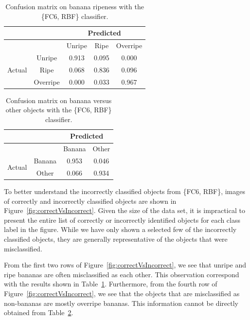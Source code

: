 \documentclass{article} %
\begin{document}
	
\begin{table}[h]
\centering
\caption{Confusion matrix on banana ripeness with the \{FC6, RBF\} classifier. }
\label{tab:ripenessMatrix}
\begin{tabular}{|c|c|c|c|c|}\hline
&&\multicolumn{3}{c|}{Predicted}\\\hline
&&Unripe&Ripe&Overripe\\\hline
\multirow{3}{*}{Actual}&Unripe&\cellcolor{SFUred!65}0.913&\cellcolor{SFUred!15}0.095&0.000\\\cline{2-5}
&Ripe&\cellcolor{SFUred!15}0.068&\cellcolor{SFUred!65}0.836&\cellcolor{SFUred!15}0.096\\\cline{2-5}
&Overripe&0.000&\cellcolor{SFUred!15}0.033&\cellcolor{SFUred!65}0.967\\\hline
\end{tabular}
\end{table}

\begin{table}[h]
\centering
\caption{Confusion matrix on banana versus other objects with the \{FC6, RBF\} classifier. }
\label{tab:objectMatrix}
\begin{tabular}{|c|c|c|c|}\hline
&&\multicolumn{2}{c|}{Predicted}\\\hline
&&Banana&Other\\\hline
\multirow{2}{*}{Actual}&Banana&\cellcolor{SFUred!65}0.953&\cellcolor{SFUred!15}0.046\\\cline{2-4}
&Other&\cellcolor{SFUred!15}0.066&\cellcolor{SFUred!65}0.934\\\hline
\end{tabular}
\end{table}

To better understand the incorrectly classified objects from \{FC6, RBF\}, images of correctly and incorrectly classified objects are shown in Figure~\ref{fig:correctVsIncorrect}. Given the size of the data set, it is impractical to present the entire list of correctly or incorrectly identified objects for each class label in the figure. While we have only shown a selected few of the incorrectly classified objects, they are generally representative of the objects that were misclassified.

From the first two rows of Figure~\ref{fig:correctVsIncorrect}, we see that unripe and ripe bananas are often misclassified as each other. This observation correspond with the results shown in Table~\ref{tab:ripenessMatrix}. Furthermore, from the fourth row of Figure~\ref{fig:correctVsIncorrect}, we see that the objects that are misclassified as non-bananas are mostly overripe bananas. This information cannot be directly obtained from Table~\ref{tab:objectMatrix}.
\end{document}
